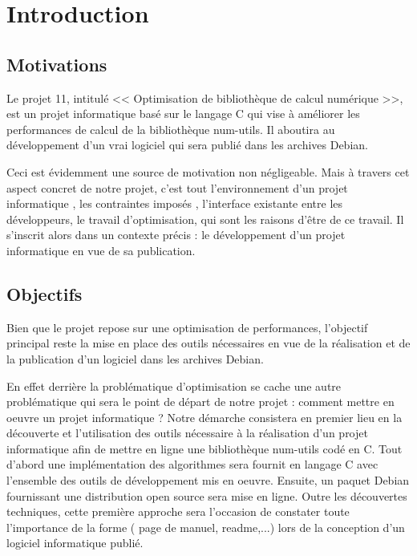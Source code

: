 \chapter{Introduction}
\label{chap:introduction}

\section{Motivations }

Le projet 11\citep{projet11}, intitul\'e << Optimisation de biblioth\`eque de calcul num\'erique >>, est un projet informatique bas\'e sur le langage C qui vise \`a am\'eliorer 
les performances de calcul de la biblioth\`eque num-utils\citep{numutils}. Il aboutira au d\'eveloppement d'un vrai logiciel qui sera publi\'e dans les archives Debian\citep{debian}.

Ceci est \'evidemment une source de motivation non n\'egligeable. Mais \`a travers cet aspect concret de notre projet, c'est tout l'environnement d'un 
projet informatique , les contraintes impos\'es , l'interface existante entre les d\'eveloppeurs, le travail d'optimisation, qui sont les raisons 
d'\^etre de ce travail.
Il s'inscrit alors dans un contexte pr\'ecis : le d\'eveloppement d'un projet informatique en vue de sa publication.

\section{Objectifs}

Bien que le projet repose sur une optimisation de performances, l'objectif principal reste la mise en place des outils n\'ecessaires en vue de la 
r\'ealisation et de la publication d'un logiciel dans les archives Debian.  

En effet derri\`ere la probl\'ematique d'optimisation se cache une autre probl\'ematique qui sera le point de d\'epart de notre projet : comment mettre
 en oeuvre un projet informatique ? 
Notre d\'emarche consistera en premier lieu en la d\'ecouverte et l'utilisation des outils n\'ecessaire \`a la r\'ealisation d'un projet informatique afin 
de mettre en ligne une biblioth\`eque num-utils cod\'e en C.
\newline 	
Tout d'abord une impl\'ementation des algorithmes sera fournit en langage C avec l'ensemble des outils de d\'eveloppement mis en oeuvre. Ensuite, 
un paquet Debian fournissant une distribution open source sera mise en ligne. 
Outre les d\'ecouvertes techniques, cette premi\`ere approche sera l'occasion de constater toute l'importance de la forme ( page de manuel, readme,...) 
lors de la conception d'un logiciel informatique publi\'e.

